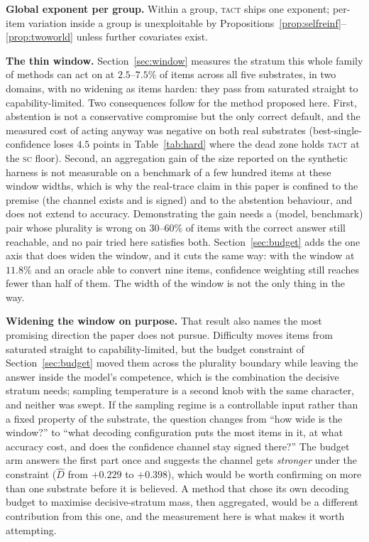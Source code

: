 \documentclass{article}
\newcommand{\Dhat}{\widehat{D}}
\newcommand{\SC}{\textsc{sc}}
\newcommand{\TACT}{\textsc{tact}}
\begin{document}
\textbf{Global exponent per group.} Within a group, \TACT{} ships one exponent; per-item variation inside a group is unexploitable by Propositions~\ref{prop:selfreinf}--\ref{prop:twoworld} unless further covariates exist.

\textbf{The thin window.} Section~\ref{sec:window} measures the stratum this
whole family of methods can act on at $2.5$--$7.5\%$ of items across all five
substrates, in two domains, with no widening as items harden: they pass from
saturated straight to capability-limited. Two consequences follow for the
method proposed here. First, abstention is not a conservative compromise but
the only correct default, and the measured cost of acting anyway was negative
on both real substrates (best-single-confidence loses $4.5$ points in
Table~\ref{tab:hard} where the dead zone holds \TACT{} at the \SC{} floor).
Second, an aggregation gain of the size reported on the synthetic harness is
not measurable on a benchmark of a few hundred items at these window widths,
which is why the real-trace claim in this paper is confined to the premise
(the channel exists and is signed) and to the abstention behaviour, and does
not extend to accuracy. Demonstrating the gain needs a (model, benchmark)
pair whose plurality is wrong on $30$--$60\%$ of items with the correct answer
still reachable, and no pair tried here satisfies both.
Section~\ref{sec:budget} adds the one axis that does widen the window, and it
cuts the same way: with the window at $11.8\%$ and an oracle able to convert
nine items, confidence weighting still reaches fewer than half of them. The
width of the window is not the only thing in the way.

\textbf{Widening the window on purpose.} That result also names the most
promising direction the paper does not pursue. Difficulty moves items from
saturated straight to capability-limited, but the budget constraint of
Section~\ref{sec:budget} moved them across the plurality boundary while leaving
the answer inside the model's competence, which is the combination the decisive
stratum needs; sampling temperature is a second knob with the same character,
and neither was swept. If the sampling regime is a controllable input rather
than a fixed property of the substrate, the question changes from ``how wide is
the window?'' to ``what decoding configuration puts the most items in it, at
what accuracy cost, and does the confidence channel stay signed there?'' The
budget arm answers the first part once and suggests the channel gets
\emph{stronger} under the constraint ($\Dhat$ from $+0.229$ to $+0.398$), which
would be worth confirming on more than one substrate before it is believed. A
method that chose its own decoding budget to maximise decisive-stratum mass,
then aggregated, would be a different contribution from this one, and the
measurement here is what makes it worth attempting.
\end{document}

